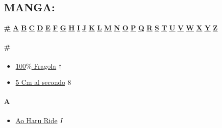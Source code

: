 \subsection[Manga]{\huge MANGA:}
\begin{center}
	\hyperlink{MA\#}{\textbf{\underline{\#}}}
	\hyperlink{MA}{\textbf{\underline{A}}} \hyperlink{MB}{\textbf{\underline{B}}} \hyperlink{MC}{\textbf{\underline{C}}} \hyperlink{MD}{\textbf{\underline{D}}} \hyperlink{ME}{\textbf{\underline{E}}} \hyperlink{MF}{\textbf{\underline{F}}} \hyperlink{MG}{\textbf{\underline{G}}} \hyperlink{MH}{\textbf{\underline{H}}} \hyperlink{MI}{\textbf{\underline{I}}} \hyperlink{MJ}{\textbf{\underline{J}}} \hyperlink{MK}{\textbf{\underline{K}}} \hyperlink{ML}{\textbf{\underline{L}}} \hyperlink{MM}{\textbf{\underline{M}}} \hyperlink{MN}{\textbf{\underline{N}}} \hyperlink{MO}{\textbf{\underline{O}}} \hyperlink{MP}{\textbf{\underline{P}}} \hyperlink{MQ}{\textbf{\underline{Q}}} \hyperlink{MR}{\textbf{\underline{R}}} \hyperlink{MS}{\textbf{\underline{S}}} \hyperlink{MT}{\textbf{\underline{T}}} \hyperlink{MU}{\textbf{\underline{U}}} \hyperlink{MV}{\textbf{\underline{V}}} \hyperlink{MW}{\textbf{\underline{W}}} \hyperlink{MX}{\textbf{\underline{X}}} 
	\hyperlink{MY}{\textbf{\underline{Y}}} \hyperlink{MZ}{\textbf{\underline{Z}}}
\end{center}

\paragraph{\#} \hypertarget{MA\#}{}

	\begin{itemize}
		
		\item \href{https://mega.nz/#!bHAllQbA!fbx8deEyr7FPV2YYW-JyWzoe3XNijyHmyHcBULJNpz8} {100$\%$ Fragola}  $\dag$ \\ 
		\item \href{https://mega.nz/#!umID0aaD!iGtDdNJIpmSecPPpflE5inqFBVnfa3ra5kWhbXU0H_A} {5 Cm al secondo}  $\oldstylenums{8}$ \\ 
			
	\end{itemize}
	
\paragraph{A} \hypertarget{MA}{}
	
	\begin{itemize}
		
		\item \href{https://mega.nz/#F!bk8DUYBB!zDSp4VitOpyk6eFtF6qKpQ} {Ao Haru Ride}  $I$ \\ 
	 
	\end{itemize}

